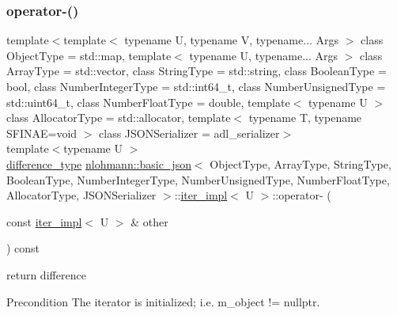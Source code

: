 \subsubsection{\texorpdfstring{operator-\/()}{operator-()}\hspace{0.1cm}{\footnotesize\ttfamily [2/2]}}
{\footnotesize\ttfamily template$<$template$<$ typename U, typename V, typename... Args $>$ class Object\+Type = std\+::map, template$<$ typename U, typename... Args $>$ class Array\+Type = std\+::vector, class String\+Type  = std\+::string, class Boolean\+Type  = bool, class Number\+Integer\+Type  = std\+::int64\+\_\+t, class Number\+Unsigned\+Type  = std\+::uint64\+\_\+t, class Number\+Float\+Type  = double, template$<$ typename U $>$ class Allocator\+Type = std\+::allocator, template$<$ typename T, typename S\+F\+I\+N\+A\+E=void $>$ class J\+S\+O\+N\+Serializer = adl\+\_\+serializer$>$ \\
template$<$typename U $>$ \\
\mbox{\hyperlink{classnlohmann_1_1basic__json_1_1iter__impl_aa3d908ee643e5938d32e5f6d261d7715}{difference\+\_\+type}} \mbox{\hyperlink{classnlohmann_1_1basic__json}{nlohmann\+::basic\+\_\+json}}$<$ Object\+Type, Array\+Type, String\+Type, Boolean\+Type, Number\+Integer\+Type, Number\+Unsigned\+Type, Number\+Float\+Type, Allocator\+Type, J\+S\+O\+N\+Serializer $>$\+::\mbox{\hyperlink{classnlohmann_1_1basic__json_1_1iter__impl}{iter\+\_\+impl}}$<$ U $>$\+::operator-\/ (\begin{DoxyParamCaption}\item[{const \mbox{\hyperlink{classnlohmann_1_1basic__json_1_1iter__impl}{iter\+\_\+impl}}$<$ U $>$ \&}]{other }\end{DoxyParamCaption}) const\hspace{0.3cm}{\ttfamily [inline]}}



return difference 

\begin{DoxyPrecond}{Precondition}
The iterator is initialized; i.\+e. {\ttfamily m\+\_\+object != nullptr}. 
\end{DoxyPrecond}
\mbox{\label{classnlohmann_1_1basic__json_1_1iter__impl_a0c3a102ac61d4c6f869fe9a5d065e91e}} 
